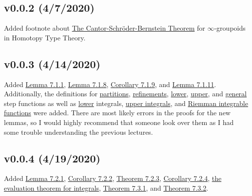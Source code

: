 \documentclass[11pt]{book}
\newcounter{theorem}
\newcounter{lemma}
\newcounter{definition}
\begin{document}
	\subsection{v0.0.2 (4/7/2020)}
		Added footnote about \hyperref[subsec:CBST]{The Cantor-Schr{\"o}der-Bernstein Theorem} for $\infty$-groupoids in Homotopy Type Theory.
	\subsection{v0.0.3 (4/14/2020)}
		Added \hyperref[subsec:lemm711]{Lemma 7.1.1}, \hyperref[subsec:lemm718]{Lemma 7.1.8}, \hyperref[subsec:cor719]{Corollary 7.1.9}, and \hyperref[subsec:lemm7111]{Lemma 7.1.11}.
		Additionally, the definitions for \hyperref[subsec:partition]{partitions}, \hyperref[subsec:refinement]{refinements}, \hyperref[subsec:lowerstepfunction]{lower}, 
		\hyperref[subsec:upperstepfunction]{upper}, and \hyperref[subsec:stepfunction]{general} step functions as well as \hyperref[subsec:lowerintegral]{lower} integrals, 
		\hyperref[subsec:upperintegral]{upper integrals}, and \hyperref[subsec:riemannintegrable]{Riemman integrable functions} were added. There are most likely errors in the proofs for the
		new lemmas, so I would highly recommend that someone look over them as I had some trouble understanding the previous lectures.

	\subsection{v0.0.4 (4/19/2020)}
		Added \hyperref[subsec:lemm721]{Lemma 7.2.1}, \hyperref[subsec:cor722]{Corollary 7.2.2}, \hyperref[subsec:theor723]{Theorem 7.2.3}, \hyperref[subsec:cor724]{Corollary 7.2.4}, 
		\hyperref[subsec:theor725]{the evaluation theorem for integrals}, \hyperref[subsec:theor731]{Theorem 7.3.1}, and \hyperref[subsec:theor732]{Theorem 7.3.2}.
\end{document}
